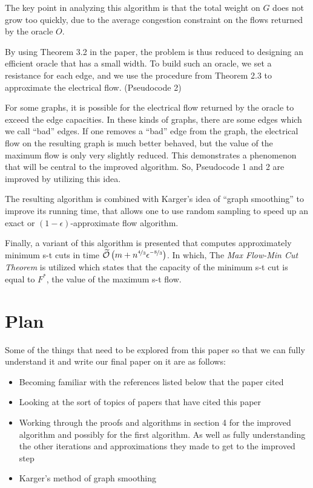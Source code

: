 \documentclass[11pt]{article}
\begin{document}
The key point in analyzing this algorithm is that the total weight on $G$ does not grow too quickly, due to the average congestion constraint on the flows returned by the oracle $O$. 

By using Theorem 3.2 in the paper, the problem is thus reduced to designing an efficient oracle that has a small width. To build such an oracle, we set a resistance for each edge, and we use the procedure from Theorem 2.3 to approximate the electrical flow. (Pseudocode 2)

For some graphs, it is possible for the electrical flow returned by the oracle to exceed the edge capacities. In these kinds of graphs, there are some edges which we call “bad” edges. If one removes a “bad” edge from the graph, the electrical flow on the resulting graph is much better behaved, but the value of the maximum flow is only very slightly reduced. This demonstrates a phenomenon that will be central to the improved algorithm. So, Pseudocode 1 and 2 are improved by utilizing this idea.

The resulting algorithm is combined with Karger’s idea of “graph smoothing” to improve its running time, that allows one to use random sampling to speed up an exact or $(1 - \epsilon)$-approximate flow algorithm.

Finally, a variant of this algorithm is presented that computes approximately minimum s-t cuts in time $\widetilde{\mathcal{O}}\left( m + n^{\unitfrac{4}{3}} \epsilon^{\unitfrac{-8}{3}} \right)$. In which, The {\em Max Flow-Min Cut Theorem} \cite{Daitch, Fleischer} is utilized which states that the capacity of the minimum s-t cut is equal to $F^{*}$, the value of the maximum s-t flow.

\section{Plan}
\label{sec:plan}

Some of the things that need to be explored from this paper so that we can fully understand it and write our final paper on it are as follows:

\begin{itemize}
\item Becoming familiar with the references listed below that the paper cited
\item Looking at the sort of topics of papers that have cited this paper
\item Working through the proofs and algorithms in section 4 for the improved algorithm and possibly for the first algorithm. As well as fully understanding the other iterations and approximations they made to get to the improved step
\item Karger’s method of graph smoothing
\end{itemize}
\end{document}

